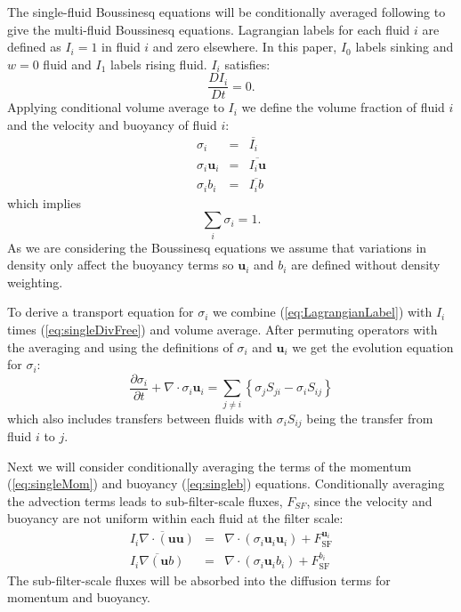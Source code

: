 \documentclass[draft]{agujournal2019}
\begin{document}
The single-fluid Boussinesq equations will be conditionally averaged following  to give the multi-fluid Boussinesq equations. Lagrangian labels for each fluid $i$ are defined as $I_i=1$ in fluid $i$ and zero elsewhere. In this paper, $I_0$ labels sinking and $w=0$ fluid and $I_1$ labels rising fluid. $I_i$ satisfies:
\begin{equation}
\frac{DI_i}{Dt}=0.
\label{eq:LagrangianLabel}
\end{equation}
Applying conditional volume average to $I_i$ we define the volume fraction of fluid $i$ and the velocity and buoyancy of fluid $i$:
\begin{eqnarray}
\sigma_i &=& \overline{I_i} \\
\sigma_i \mathbf{u}_i &=& \overline{I_i \mathbf{u}} \\
\sigma_i b_i &=& \overline{I_i b}
\label{eq:defineFluidFields}
\end{eqnarray}
which implies
\begin{equation}
\sum_{i}\sigma_{i}  =  1.
\label{eq:sumOne}
\end{equation}
As we are considering the Boussinesq equations we assume that variations in density only affect the buoyancy terms so $\mathbf{u}_i$ and $b_i$ are defined without density weighting. 

To derive a transport equation for $\sigma_i$ we combine (\ref{eq:LagrangianLabel}) with $I_i$ times (\ref{eq:singleDivFree}) and volume average. After permuting operators with the averaging \cite<as described by>{TWV+18} and using the definitions of $\sigma_i$ and $\mathbf{u}_i$ we get the evolution equation for $\sigma_i$:
\begin{equation}
\frac{\partial\sigma_{i}}{\partial t}+\nabla\cdot\sigma_{i}\mathbf{u}_{i}  =  \sum_{j\ne i}\left\{ \sigma_{j}S_{ji}-\sigma_{i}S_{ij}\right\}
\label{eq:sigma}
\end{equation}
which also includes transfers between fluids with $\sigma_{i}S_{ij}$ being the transfer from fluid $i$ to $j$.

Next we will consider conditionally averaging the terms of the momentum (\ref{eq:singleMom}) and buoyancy (\ref{eq:singleb}) equations. Conditionally averaging the advection terms leads to sub-filter-scale fluxes, $F_{SF}$, since the velocity and buoyancy are not uniform within each fluid at the filter scale:
\begin{eqnarray}
\overline{I_i \nabla \cdot (\mathbf{u} \mathbf{u})} &=& \nabla \cdot (\sigma_i \mathbf{u}_i  \mathbf{u}_i) + F_\text{SF}^{\mathbf{u}_i} \\
\overline{I_i \nabla (\mathbf{u} b)} &=&  \nabla \cdot (\sigma_i \mathbf{u}_i b_i) + F_\text{SF}^{b_i}
\label{eq:filterAdvection}
\end{eqnarray}
The sub-filter-scale fluxes will be absorbed into the diffusion terms for momentum and buoyancy.
\end{document}
